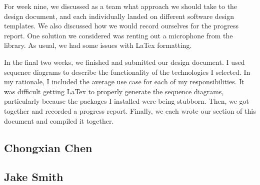 \documentclass[letterpaper, 10pt,titlepage]{article}
\begin{document}
\par For week nine, we discussed as a team what approach we should take to the design document, and each individually landed on different software design templates. We also discussed how we would record ourselves for the progress report. One solution we considered was renting out a microphone from the library. As usual, we had some issues with LaTex formatting.
\par In the final two weeks, we finished and submitted our design document. I used sequence diagrams to describe the functionality of the technologies I selected. In my rationale, I included the average use case for each of my responsibilities.  It was difficult getting LaTex to properly generate the sequence diagrams, particularly because the packages I installed were being stubborn. Then, we got together and recorded a progress report. Finally, we each wrote our section of this document and compiled it together.
\subsection{Chongxian Chen}
\subsection{Jake Smith}
\end{document}
